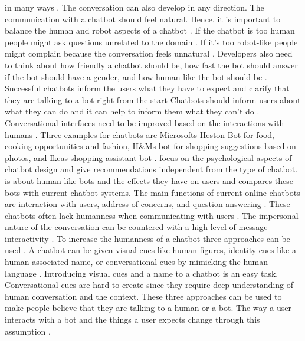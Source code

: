in many ways \cite{brandtzaeg2018chatbots}.
The conversation can also develop in any direction.
The communication with a chatbot should feel natural.
Hence, it is important to balance the human and robot aspects of a chatbot \cite{brandtzaeg2018chatbots}.
If the chatbot is too human people might ask questions unrelated to the domain \cite{brandtzaeg2018chatbots}.
If it's too robot-like people might complain because the conversation feels unnatural \cite{brandtzaeg2018chatbots}.
Developers also need to think about how friendly a chatbot should be, how fast the bot should answer if the bot should
have a gender, and how human-like the bot should be \cite{brandtzaeg2018chatbots}.
Successful chatbots inform the users what they have to expect and clarify that they are talking to a bot 
right from the start \cite{brandtzaeg2018chatbots}
Chatbots should inform users about what they can do and it can help to inform them what 
they can't do \cite{brandtzaeg2018chatbots}.
Conversational interfaces need to be improved based on the interactions with humans \cite{brandtzaeg2018chatbots}.
Three examples for chatbots are Microsofts Heston Bot for food, cooking opportunities and fashion, H\&Ms bot for shopping 
suggestions based on photos, and Ikeas shopping assistant bot \cite{brandtzaeg2018chatbots}.
\citet{brandtzaeg2018chatbots} focus on the psychological aspects of chatbot design and give recommendations
independent from the type of chatbot.
\citet{GO2019304} is about human-like bots and the effects they have on users and compares these bots with current chatbot systems.
The main functions of current online chatbots are interaction with users, address of concerns, and question answering \cite{GO2019304}.
These chatbots often lack humanness when communicating with users \cite{GO2019304}.
The impersonal nature of the conversation can be countered with a high level of message interactivity \cite{GO2019304}.
To increase the humanness of a chatbot three approaches can be used \cite{GO2019304}.
A chatbot can be given visual cues like human figures, identity cues like a human-associated name, or 
conversational cues by mimicking the human language \cite{GO2019304}.
Introducing visual cues and a name to a chatbot is an easy task.
Conversational cues are hard to create since they require deep
understanding of human conversation and the context.
These three approaches can be used to make people believe that they are talking to a human or a bot.
The way a user interacts with a bot and the things a user expects change through this assumption \cite{sundar2016theoretical, GO2019304}.
